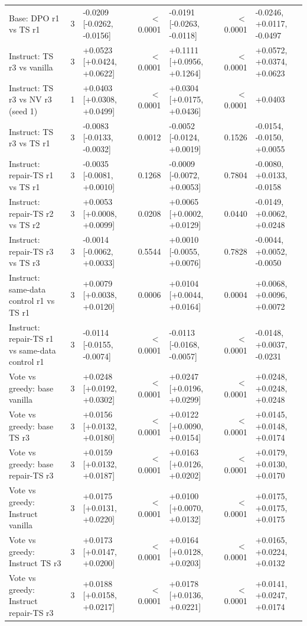\begin{landscape}
{\begin{longtable}{@{}p{6.2cm}clrlrp{4.0cm}@{}}
Base: DPO r1 vs TS r1 & 3 & -0.0209 [-0.0262, -0.0156] & $<$0.0001 & -0.0191 [-0.0263, -0.0118] & $<$0.0001 & -0.0246, +0.0117, -0.0497\\
Instruct: TS r3 vs vanilla & 3 & +0.0523 [+0.0424, +0.0622] & $<$0.0001 & +0.1111 [+0.0956, +0.1264] & $<$0.0001 & +0.0572, +0.0374, +0.0623\\
Instruct: TS r3 vs NV r3 (seed 1) & 1 & +0.0403 [+0.0308, +0.0499] & $<$0.0001 & +0.0304 [+0.0175, +0.0436] & $<$0.0001 & +0.0403\\
Instruct: TS r3 vs TS r1 & 3 & -0.0083 [-0.0133, -0.0032] & 0.0012 & -0.0052 [-0.0124, +0.0019] & 0.1526 & -0.0154, -0.0150, +0.0055\\
Instruct: repair-TS r1 vs TS r1 & 3 & -0.0035 [-0.0081, +0.0010] & 0.1268 & -0.0009 [-0.0072, +0.0053] & 0.7804 & -0.0080, +0.0133, -0.0158\\
Instruct: repair-TS r2 vs TS r2 & 3 & +0.0053 [+0.0008, +0.0099] & 0.0208 & +0.0065 [+0.0002, +0.0129] & 0.0440 & -0.0149, +0.0062, +0.0248\\
Instruct: repair-TS r3 vs TS r3 & 3 & -0.0014 [-0.0062, +0.0033] & 0.5544 & +0.0010 [-0.0055, +0.0076] & 0.7828 & -0.0044, +0.0052, -0.0050\\
Instruct: same-data control r1 vs TS r1 & 3 & +0.0079 [+0.0038, +0.0120] & 0.0006 & +0.0104 [+0.0044, +0.0164] & 0.0004 & +0.0068, +0.0096, +0.0072\\
Instruct: repair-TS r1 vs same-data control r1 & 3 & -0.0114 [-0.0155, -0.0074] & $<$0.0001 & -0.0113 [-0.0168, -0.0057] & $<$0.0001 & -0.0148, +0.0037, -0.0231\\
Vote vs greedy: base vanilla & 3 & +0.0248 [+0.0192, +0.0302] & $<$0.0001 & +0.0247 [+0.0196, +0.0299] & $<$0.0001 & +0.0248, +0.0248, +0.0248\\
Vote vs greedy: base TS r3 & 3 & +0.0156 [+0.0132, +0.0180] & $<$0.0001 & +0.0122 [+0.0090, +0.0154] & $<$0.0001 & +0.0145, +0.0148, +0.0174\\
Vote vs greedy: base repair-TS r3 & 3 & +0.0159 [+0.0132, +0.0187] & $<$0.0001 & +0.0163 [+0.0126, +0.0202] & $<$0.0001 & +0.0179, +0.0130, +0.0170\\
Vote vs greedy: Instruct vanilla & 3 & +0.0175 [+0.0131, +0.0220] & $<$0.0001 & +0.0100 [+0.0070, +0.0132] & $<$0.0001 & +0.0175, +0.0175, +0.0175\\
Vote vs greedy: Instruct TS r3 & 3 & +0.0173 [+0.0147, +0.0200] & $<$0.0001 & +0.0164 [+0.0128, +0.0203] & $<$0.0001 & +0.0165, +0.0224, +0.0132\\
Vote vs greedy: Instruct repair-TS r3 & 3 & +0.0188 [+0.0158, +0.0217] & $<$0.0001 & +0.0178 [+0.0136, +0.0221] & $<$0.0001 & +0.0141, +0.0247, +0.0174\\

\end{longtable}}
\end{landscape}
